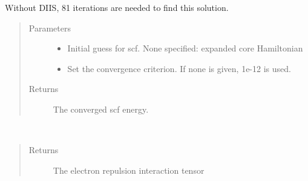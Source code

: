 \documentclass[letterpaper,10pt,english]{sphinxmanual}
\begin{document}
\begin{fulllineitems}
\begin{fulllineitems}
\begin{sphinxVerbatim}[commandchars=\\\{\}]
          
   
  
\end{sphinxVerbatim}

Without DIIS, 81 iterations are needed to find this solution.
\begin{quote}\begin{description}
\item[{Parameters}] \leavevmode\begin{itemize}
\item {} 
 \textendash{} Initial guess for scf. None specified: expanded core Hamiltonian

\item {} 
 \textendash{} Set the convergence criterion. If none is given, 1e-12 is used.

\end{itemize}

\item[{Returns}] \leavevmode
The converged scf energy.

\end{description}\end{quote}

\end{fulllineitems}


\begin{fulllineitems}
\label{\detokenize{Real_GHF:ghf.real_GHF.RealGHF.get_two_e}}~\begin{quote}\begin{description}
\item[{Returns}] \leavevmode
The electron repulsion interaction tensor


\end{description}
\end{quote}
\end{fulllineitems}
\end{fulllineitems}
\end{document}
